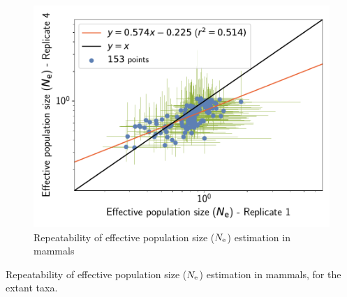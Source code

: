 \documentclass{article}
\begin{document}
\begin{figure}[H]
\begin{minipage}{0.32\linewidth}
			\includegraphics[width=\linewidth, page=1]{mammals/18CDS_SiteMutSelBranchNe_Rep_LogPopulationSize-1-4}
		\end{minipage}
		\caption[Repeatability of $\Ne$ estimation in mammals]{Repeatability of {effective population size} ($\Ne$) estimation in mammals}
	\end{figure}

	\begin{table}[htbp]
		\renewcommand{\arraystretch}{0.5}
		\scriptsize \centering
		
		\caption[Repeatability of $\Ne$ estimation in mammals]{Repeatability of {effective population size} ($\Ne$) estimation in mammals, for the extant taxa.}
		\label{tab:Ne-estimated-mammals}
	\end{table}
\end{document}
